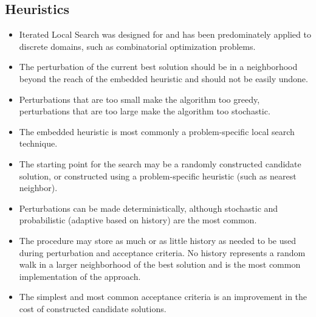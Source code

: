 \subsection{Heuristics}

\begin{itemize}
	\item Iterated Local Search was designed for and has been predominately applied to discrete domains, such as combinatorial optimization problems.
	\item The perturbation of the current best solution should be in a neighborhood beyond the reach of the embedded heuristic and should not be easily undone.
	\item Perturbations that are too small make the algorithm too greedy, perturbations that are too large make the algorithm too stochastic.
	\item The embedded heuristic is most commonly a problem-specific local search technique.
	\item The starting point for the search may be a randomly constructed candidate solution, or constructed using a problem-specific heuristic (such as nearest neighbor).
	\item Perturbations can be made deterministically, although stochastic and probabilistic (adaptive based on history) are the most common.
	\item The procedure may store as much or as little history as needed to be used during perturbation and acceptance criteria. No history represents a random walk in a larger neighborhood of the  best solution and is the most common implementation of the approach.
	\item The simplest and most common acceptance criteria is an improvement in the cost of constructed candidate solutions.
\end{itemize}

